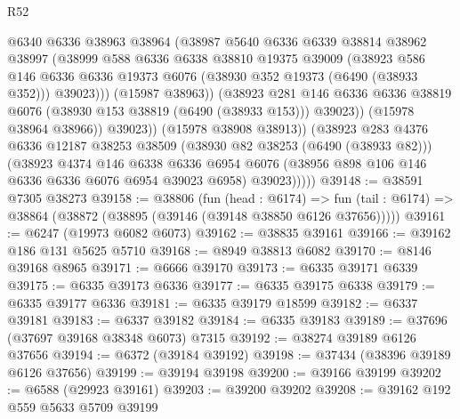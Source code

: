\begin{lexlean}{R52}
\begin{coremodule}
                      @6340
                      @6336
                      @38963
                      @38964
                      (@38987
                        @5640
                        @6336
                        @6339
                        @38814
                        @38962
                        @38997
                        (@38999
                          @588
                          @6336
                          @6338
                          @38810
                          @19375
                          @39009
                          (@38923
                            @586
                            @146
                            @6336
                            @6336
                            @19373
                            @6076
                            (@38930 @352 @19373 (@6490 (@38933 @352)))
                            @39023)))
                      (@15987 @38963))
                    (@38923
                      @281
                      @146
                      @6336
                      @6336
                      @38819
                      @6076
                      (@38930 @153 @38819 (@6490 (@38933 @153)))
                      @39023))
                  (@15978 @38964 @38966))
                @39023))
            (@15978 @38908 @38913))
          (@38923
            @283
            @4376
            @6336
            @12187
            @38253
            @38509
            (@38930 @82 @38253 (@6490 (@38933 @82)))
            (@38923
              @4374
              @146
              @6338
              @6336
              @6954
              @6076
              (@38956 @898 @106 @146 @6336 @6336 @6076 @6954 @39023 @6958)
              @39023)))))
@39148 := @38591 @7305 @38273
@39158 := @38806
    (fun (head : @6174) =>
    fun (tail : @6174) => @38864 (@38872 (@38895 (@39146 (@39148 @38850 @6126 @37656)))))
@39161 := @6247 (@19973 @6082 @6073)
@39162 := @38835 @39161
@39166 := @39162 @186 @131 @5625 @5710
@39168 := @8949 @38813 @6082
@39170 := @8146 @39168 @8965
@39171 := @6666 @39170
@39173 := @6335 @39171 @6339
@39175 := @6335 @39173 @6336
@39177 := @6335 @39175 @6338
@39179 := @6335 @39177 @6336
@39181 := @6335 @39179 @18599
@39182 := @6337 @39181
@39183 := @6337 @39182
@39184 := @6335 @39183
@39189 := @37696 (@37697 @39168 @38348 @6073) @7315
@39192 := @38274 @39189 @6126 @37656
@39194 := @6372 (@39184 @39192)
@39198 := @37434 (@38396 @39189 @6126 @37656)
@39199 := @39194 @39198
@39200 := @39166 @39199
@39202 := @6588 (@29923 @39161)
@39203 := @39200 @39202
@39208 := @39162 @192 @559 @5633 @5709 @39199

\end{coremodule}
\end{lexlean}
